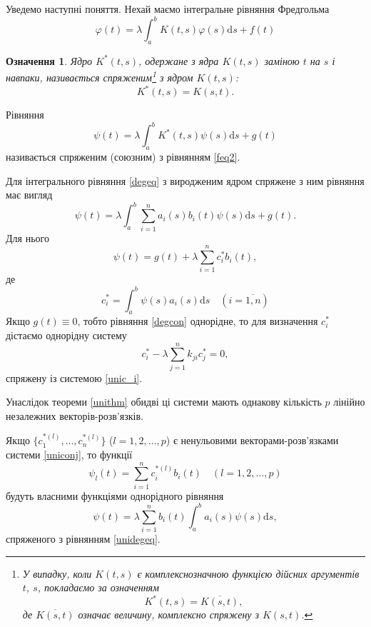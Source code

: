 \documentclass[14pt,twoside]{extreport}
\theoremstyle{mystyle}
\newtheorem{dfn}{Означення}
\numberwithin{equation}{chapter}
\begin{document}
\begin{enumerate}
Уведемо наступні поняття. Нехай маємо інтегральне рівняння Фредгольма
\begin{equation}\label{feq2}
 \displaystyle \varphi(t)=\lambda\int_{a}^{b}K(t, s)\varphi(s)\mathrm{d}s+f(t)
\end{equation}
\begin{dfn}
    Ядро $K^*(t, s)$, одержане з ядра $K(t, s)$ заміною $t$ на $s$ і навпаки, називається спряженим\footnote{У випадку, коли $K(t, s)$ є комплекснозначною функцією дійсних аргументів $t$, $s$, покладаємо за означенням
\[
K^*(t,s) = \overline{K(s, t)},
\]
де $\overline{K(s, t)}$ означає величину, комплексно спряжену з $K(s,t)$.} з ядром $K(t, s)$:
\begin{equation}
 K^*(t,s) = K(s,t).
\end{equation}
\end{dfn}

Рівняння
\begin{equation}
 \psi(t)=\lambda \int_{a}^{b} K^{*}(t, s)\psi(s)\mathrm{d}s+g(t)
\end{equation}
називається спряженим (союзним) з рівнянням \eqref{feq2}.

Для інтегрального рівняння \eqref{degeq} з виродженим ядром спряжене з ним рівняння має вигляд
\begin{equation}\label{degcon}
 \psi(t)=\lambda \int_{a}^{b} \sum_{i=1}^{n} a_{i}(s)b_{i}(t)\psi(s)\mathrm{d}s+g(t).
\end{equation}
Для нього
\begin{equation}
 \displaystyle \psi(t)=g(t)+\lambda\sum_{i=1}^{n}c_{i}^{*}b_{i}(t),
\end{equation}
де
\begin{equation}
 c_{i}^{*}=\int_{a}^{b} \psi(s) a_i(s) \mathrm{d}s \quad (i=\overline{1, n})
\end{equation}
Якщо $g(t) \equiv 0$, тобто рівняння \eqref{degcon} однорідне, то для визначення $c_{i}^{*}$ дістаємо однорідну систему
\begin{equation}\label{uniconj}
c_{i}^{*}-\displaystyle \lambda\sum_{j=1}^{n}k_{ji}c_{j}^{*}=0,
\end{equation}
спряжену із системою \eqref{unic_i}.

Унаслідок теореми \ref{unithm} обидві ці системи мають однакову кількість $p$ лінійно незалежних векторів-розв'язків.

Якщо $\{c_1^{*(l)}, \ldots, c_n^{*(l)}\}$ ($l=1, 2, \ldots, p$) є ненульовими векторами-розв'язками системи \eqref{uniconj}, то функції
\[
 \psi_{l}(t)=\sum_{i=1}^{n}c_{i}^{*(l)}b_{i}(t) \quad (l=1, 2, \ldots, p)
\]
будуть власними функціями однорідного рівняння
\begin{equation}\label{unidegeq1}
 \displaystyle \psi(t)=\lambda\sum_{i=1}^{n}b_{i}(t)\int_{a}^{b}a_{i}(s)\psi(s)\mathrm{d}s,
\end{equation}
спряженого з рівнянням \eqref{unidegeq}.


\end{enumerate}
\end{document}
